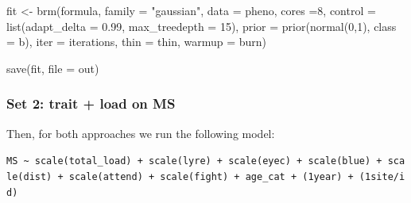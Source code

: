 \documentclass[
  letterpaper,
  DIV=11,
  numbers=noendperiod]{scrreprt}
\newenvironment{Shaded}{}{}
\newcommand{\AttributeTok}[1]{\textcolor[rgb]{0.84,0.23,0.29}{#1}}
\newcommand{\DecValTok}[1]{\textcolor[rgb]{0.00,0.36,0.77}{#1}}
\newcommand{\FloatTok}[1]{\textcolor[rgb]{0.00,0.36,0.77}{#1}}
\newcommand{\FunctionTok}[1]{\textcolor[rgb]{0.44,0.26,0.76}{#1}}
\newcommand{\NormalTok}[1]{\textcolor[rgb]{0.14,0.16,0.18}{#1}}
\newcommand{\OtherTok}[1]{\textcolor[rgb]{0.44,0.26,0.76}{#1}}
\newcommand{\StringTok}[1]{\textcolor[rgb]{0.01,0.18,0.38}{#1}}
\begin{document}
\begin{Shaded}
\begin{Highlighting}[]
\NormalTok{fit }\OtherTok{\textless{}{-}} \FunctionTok{brm}\NormalTok{(formula,}
            \AttributeTok{family =} \StringTok{"gaussian"}\NormalTok{,}
           \AttributeTok{data =}\NormalTok{ pheno, }
           \AttributeTok{cores =}\DecValTok{8}\NormalTok{,}
           \AttributeTok{control =} \FunctionTok{list}\NormalTok{(}\AttributeTok{adapt\_delta =} \FloatTok{0.99}\NormalTok{, }\AttributeTok{max\_treedepth =} \DecValTok{15}\NormalTok{),}
           \AttributeTok{prior =} \FunctionTok{prior}\NormalTok{(}\FunctionTok{normal}\NormalTok{(}\DecValTok{0}\NormalTok{,}\DecValTok{1}\NormalTok{), }\AttributeTok{class =}\NormalTok{ b),}
           \AttributeTok{iter =}\NormalTok{ iterations, }
           \AttributeTok{thin =}\NormalTok{ thin, }\AttributeTok{warmup =}\NormalTok{ burn)}

\FunctionTok{save}\NormalTok{(fit, }\AttributeTok{file =}\NormalTok{ out)}
\end{Highlighting}
\end{Shaded}

\hypertarget{set-2-trait-load-on-ms}{%
\subsubsection{Set 2: trait + load on MS}\label{set-2-trait-load-on-ms}}

Then, for both approaches we run the following model:

\texttt{MS\ \textasciitilde{}\ scale(total\_load)\ +\ scale(lyre)\ +\ scale(eyec)\ +\ scale(blue)\ +\ scale(dist)\ +\ scale(attend)\ +\ scale(fight)\ +\ age\_cat\ +\ (1\textbar{}year)\ +\ (1\textbar{}site/id)}
\end{document}
